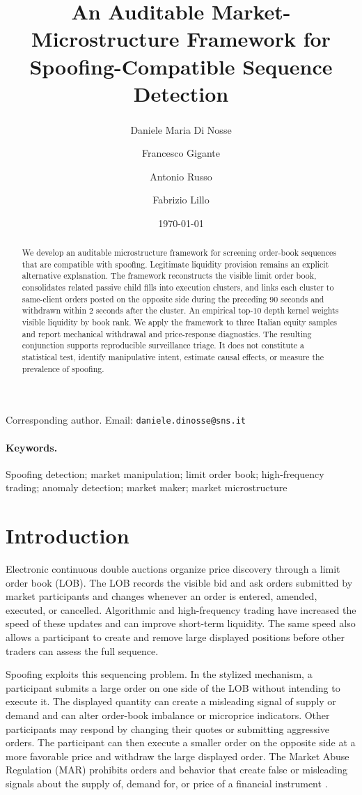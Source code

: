 \documentclass[11pt]{article}
\title{An Auditable Market-Microstructure Framework for Spoofing-Compatible Sequence Detection}
\author[1]{Daniele Maria Di Nosse\textsuperscript{\dag}}
\author[2]{Francesco Gigante}
\author[2]{Antonio Russo}
\author[1]{Fabrizio Lillo}
\affil[1]{Scuola Normale Superiore, Pisa, Italy}
\affil[2]{Consob, Rome, Italy}
\date{\today}
\begin{document}
\maketitle
\begin{center}
  \footnotesize
  \dag Corresponding author. Email: \texttt{daniele.dinosse@sns.it}
\end{center}

\begin{abstract}
We develop an auditable microstructure framework for screening order-book sequences that are compatible with spoofing.
Legitimate liquidity provision remains an explicit alternative explanation. The framework reconstructs the visible limit
order book, consolidates related passive child fills into execution clusters, and links each cluster to same-client orders
posted on the opposite side during the preceding $90$ seconds and withdrawn within $2$ seconds after the cluster. An
empirical top-$10$ depth kernel weights visible liquidity by book rank. We apply the framework to three Italian equity
samples and report mechanical withdrawal and price-response diagnostics. The resulting conjunction supports reproducible
surveillance triage. It does not constitute a statistical test, identify manipulative intent, estimate causal effects, or
measure the prevalence of spoofing.
\end{abstract}

\paragraph{Keywords.}
Spoofing detection; market manipulation; limit order book; high-frequency trading; anomaly detection; market maker; market microstructure

\section{Introduction}
\label{sec:introduction}
Electronic continuous double auctions organize price discovery through a limit order book (LOB). The LOB records the
visible bid and ask orders submitted by market participants and changes whenever an order is entered, amended, executed,
or cancelled. Algorithmic and high-frequency trading have increased the speed of these updates and can improve short-term
liquidity. The same speed also allows a participant to create and remove large displayed positions before other traders
can assess the full sequence.

Spoofing exploits this sequencing problem. In the stylized mechanism, a participant submits a large order on one side of
the LOB without intending to execute it. The displayed quantity can create a misleading signal of supply or demand and
can alter order-book imbalance or microprice indicators. Other participants may respond by changing their quotes or
submitting aggressive orders. The participant can then execute a smaller order on the opposite side at a more favorable
price and withdraw the large displayed order. The Market Abuse Regulation (MAR) prohibits orders and behavior that create
false or misleading signals about the supply of, demand for, or price of a financial instrument \cite{EU5962014}.
\end{document}
